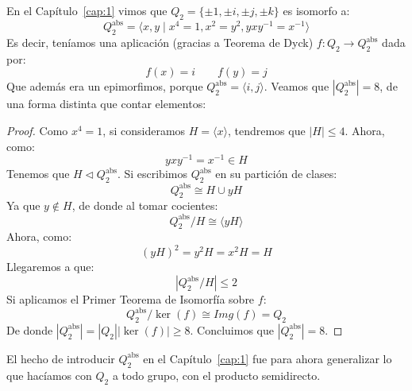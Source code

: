 \begin{ejemplo}
    En el Capítulo~\ref{cap:1} vimos que $Q_2 = \{\pm 1, \pm i, \pm j, \pm k\}$ es isomorfo a:
    \begin{equation*}
        Q_2^{\text{abs}} = \langle x,y\mid x^4=1, x^2=y^2, yxy^{-1} = x^{-1} \rangle 
    \end{equation*}
    Es decir, teníamos una aplicación (gracias a Teorema de Dyck) $f:Q_2\to Q_2^{\text{abs}}$ dada por:
    \begin{equation*}
        f(x) = i \qquad f(y) = j
    \end{equation*}
    Que además era un epimorfimos, porque $Q_2^{\text{abs}} = \langle i,j \rangle $. Veamos que $|Q_2^{\text{abs}}| = 8$, de una forma distinta que contar elementos:
    \begin{proof} %
        Como $x^4 = 1$, si consideramos $H = \langle x \rangle $, tendremos que $|H| \leq 4$. Ahora, como:
        \begin{equation*}
            yxy^{-1} = x^{-1}\in H
        \end{equation*}
        Tenemos que $H\lhd Q_2^{\text{abs}}$. Si escribimos $Q_2^{\text{abs}}$ en su partición de clases:
        \begin{equation*}
            Q_2^{\text{abs}} \cong H\cup yH
        \end{equation*}
        Ya que $y\notin H$, de donde al tomar cocientes:
        \begin{equation*}
            Q_2^{\text{abs}}/H\cong \langle yH \rangle 
        \end{equation*}
        Ahora, como:
        \begin{equation*}
            {(yH)}^{2} = y^2H = x^2H = H
        \end{equation*}
        Llegaremos a que:
        \begin{equation*}
            |Q_2^{\text{abs}}/H| \leq 2
        \end{equation*}
        Si aplicamos el Primer Teorema de Isomorfía sobre $f$:
        \begin{equation*}
            Q_2^{\text{abs}}/\ker(f) \cong Img(f) = Q_2
        \end{equation*}
        De donde $|Q_2^{\text{abs}}| = |Q_2||\ker(f)| \geq 8$. Concluimos que $|Q_2^{\text{abs}}| = 8$.
    \end{proof}
\end{ejemplo}

\noindent
El hecho de introducir $Q_2^{\text{abs}}$ en el Capítulo~\ref{cap:1} fue para ahora generalizar lo que hacíamos con $Q_2$ a todo grupo, con el producto semidirecto.

